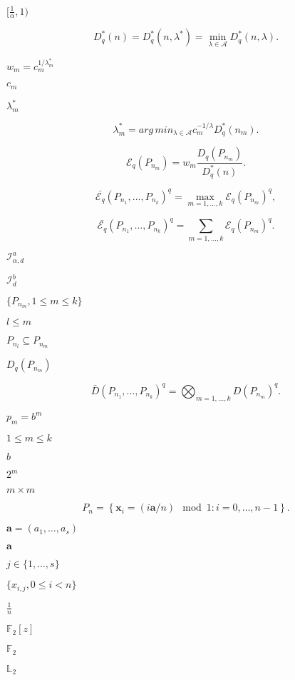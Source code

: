 \documentclass{article}
\begin{document}
$[\frac{1}{\alpha}, 1)$
\pagebreak

\[D^\ast_q(n) = D^\ast_q(n, \lambda^\ast) = \min_{\lambda \in \mathcal A} D^\ast_q(n, \lambda).
\]
\pagebreak

$w_m = c_m^{1 / \lambda^\ast_m}$
\pagebreak

$c_m$
\pagebreak

$\lambda^\ast_m$
\pagebreak

\[    \lambda^\ast_m = arg\,min_{\lambda \in \mathcal A} c_m^{-1/\lambda }D^\ast_q(n_m).
\]
\pagebreak

\[\mathcal E_q(P_{n_m}) = w_m \frac{D_q(P_{n_m})}{D^\ast_q(n)}.
\]
\pagebreak

\[    \bar{\mathcal E_q}(P_{n_1}, \dots, P_{n_k})^q = \max_{m = 1, \dots, k} \mathcal E_q(P_{n_m})^q,
\]
\pagebreak

\[    \bar{\mathcal E_q}(P_{n_1}, \dots, P_{n_k})^q = \sum_{m = 1, \dots, k} \mathcal E_q(P_{n_m})^q.
\]
\pagebreak

$ \mathcal I^{a}_{\alpha, d}$
\pagebreak

$ \mathcal I^{b}_{d}$
\pagebreak

$\{P_{n_m}, 1 \leq m \leq k \}$
\pagebreak

$l \leq m$
\pagebreak

$P_{n_l} \subseteq P_{n_m}$
\pagebreak

$D_q(P_{n_m})$
\pagebreak

\[    \bar{D}(P_{n_1}, \dots, P_{n_k})^q = \bigotimes_{m = 1, \dots, k} D(P_{n_m})^q. 
\]
\pagebreak

$p_m = b^{m}$
\pagebreak

$1 \leq m \leq k$
\pagebreak

$b$
\pagebreak

$2^m$
\pagebreak

$m \times m$
\pagebreak

\[    P_n = \left\{\boldsymbol x_i = (i \boldsymbol a / n) \mod 1 : i = 0, \dots, n - 1\right\}.
\]
\pagebreak

$\boldsymbol a = (a_1, \dots, a_s)$
\pagebreak

$\boldsymbol a$
\pagebreak

$j \in \{1, \dots, s\}$
\pagebreak

$\{x_{i,j}, 0 \leq i < n\}$
\pagebreak

$\frac1n$
\pagebreak

$\mathbb F_2[z]$
\pagebreak

$\mathbb F_2$
\pagebreak

$\mathbb L_2$
\pagebreak
\end{document}
